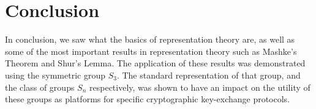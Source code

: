 \section{Conclusion}

In conclusion, we saw what the basics of representation theory are, as well as some of the most important results in representation theory such as Mashke's Theorem and Shur's Lemma.
The application of these results was demonstrated using the symmetric group $S_3$.
The standard representation of that group, and the class of groups $S_n$ respectively, was shown to have an impact on the utility of these groups as platforms for specific cryptographic key-exchange protocols.
